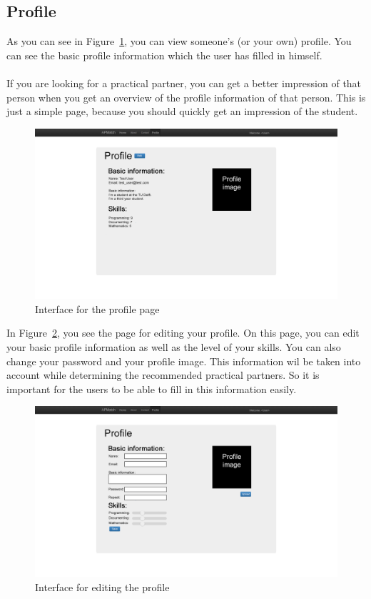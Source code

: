 \subsection{Profile}
As you can see in Figure~\ref{mockup_profile}, you can view someone's (or your own) profile.
You can see the basic profile information which the user has filled in himself.
\\\\
If you are looking for a practical partner, you can get a better impression of that person when you get an overview of the profile information of that person.
This is just a simple page, because you should quickly get an impression of the student.\\

\begin{figure}[h]
    \centering
    \captionsetup{justification=centering}
    \includegraphics[width=\textwidth, frame]{images/mockup_profile}
    \caption{Interface for the profile page}
    \label{mockup_profile}
\end{figure}

\noindent In Figure~\ref{mockup_edit_profile}, you see the page for editing your profile.
On this page, you can edit your basic profile information as well as the level of your skills.
You can also change your password and your profile image.
This information wil be taken into account while determining the recommended practical partners.
So it is important for the users to be able to fill in this information easily.

\begin{figure}[h]
    \centering
    \captionsetup{justification=centering}
    \includegraphics[width=\textwidth, frame]{images/mockup_edit_profile}
    \caption{Interface for editing the profile}
    \label{mockup_edit_profile}
\end{figure}

